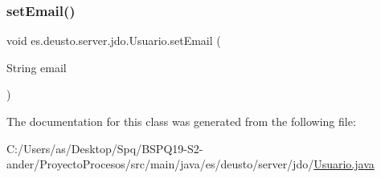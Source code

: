 \mbox{\label{classes_1_1deusto_1_1server_1_1jdo_1_1_usuario_a21f39f8557815c50c81baf11b13c666f}} 
\subsubsection{\texorpdfstring{setEmail()}{setEmail()}}
{\footnotesize\ttfamily void es.\+deusto.\+server.\+jdo.\+Usuario.\+set\+Email (\begin{DoxyParamCaption}\item[{String}]{email }\end{DoxyParamCaption})}



The documentation for this class was generated from the following file\+:\begin{DoxyCompactItemize}
\item 
C\+:/\+Users/as/\+Desktop/\+Spq/\+B\+S\+P\+Q19-\/\+S2-\/ander/\+Proyecto\+Procesos/src/main/java/es/deusto/server/jdo/\mbox{\hyperlink{_usuario_8java}{Usuario.\+java}}\end{DoxyCompactItemize}
